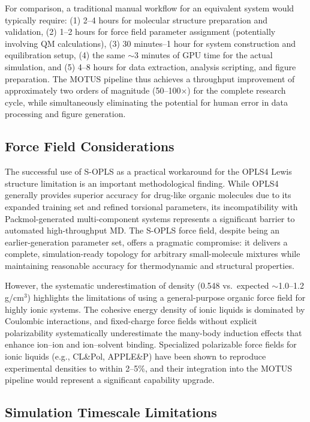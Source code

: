 \documentclass[twocolumn,10pt]{article}
\begin{document}
For comparison, a traditional manual workflow for an equivalent system would typically require: (1) 2--4 hours for molecular structure preparation and validation, (2) 1--2 hours for force field parameter assignment (potentially involving QM calculations), (3) 30 minutes--1 hour for system construction and equilibration setup, (4) the same $\sim$3 minutes of GPU time for the actual simulation, and (5) 4--8 hours for data extraction, analysis scripting, and figure preparation. The MOTUS pipeline thus achieves a throughput improvement of approximately two orders of magnitude (50--100$\times$) for the complete research cycle, while simultaneously eliminating the potential for human error in data processing and figure generation.

\subsection{Force Field Considerations}

The successful use of S-OPLS as a practical workaround for the OPLS4 Lewis structure limitation is an important methodological finding. While OPLS4 generally provides superior accuracy for drug-like organic molecules due to its expanded training set and refined torsional parameters, its incompatibility with Packmol-generated multi-component systems represents a significant barrier to automated high-throughput MD. The S-OPLS force field, despite being an earlier-generation parameter set, offers a pragmatic compromise: it delivers a complete, simulation-ready topology for arbitrary small-molecule mixtures while maintaining reasonable accuracy for thermodynamic and structural properties.

However, the systematic underestimation of density (0.548 vs.\ expected $\sim$1.0--1.2 g/cm$^3$) highlights the limitations of using a general-purpose organic force field for highly ionic systems. The cohesive energy density of ionic liquids is dominated by Coulombic interactions, and fixed-charge force fields without explicit polarizability systematically underestimate the many-body induction effects that enhance ion--ion and ion--solvent binding. Specialized polarizable force fields for ionic liquids (e.g., CL\&Pol, APPLE\&P) have been shown to reproduce experimental densities to within 2--5\%, and their integration into the MOTUS pipeline would represent a significant capability upgrade.

\subsection{Simulation Timescale Limitations}
\end{document}
